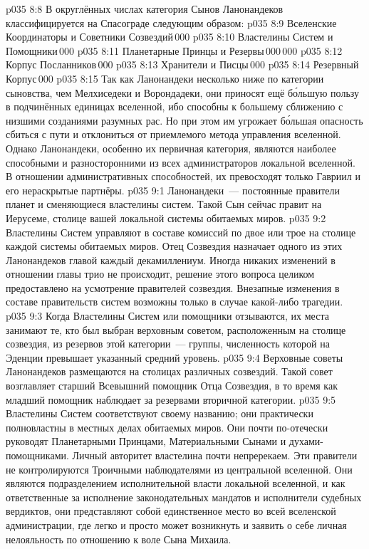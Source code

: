 \vs p035 8:8 В округлённых числах категория Сынов Ланонандеков классифицируется на Спасограде следующим образом:
\vs p035 8:9 \pc Вселенские Координаторы и Советники Созвездий\,000
\vs p035 8:10 Властелины Систем и Помощники\,000
\vs p035 8:11 Планетарные Принцы и Резервы\,000\,000
\vs p035 8:12 Корпус Посланников\,000
\vs p035 8:13 Хранители и Писцы\,000
\vs p035 8:14 Резервный Корпус\,000
\vs p035 8:15 \pc Так как Ланонандеки несколько ниже по категории сыновства, чем Мелхиседеки и Ворондадеки, они приносят ещё б\'ольшую пользу в подчинённых единицах вселенной, ибо способны к большему сближению с низшими созданиями разумных рас. Но при этом им угрожает б\'ольшая опасность сбиться с пути и отклониться от приемлемого метода управления вселенной. Однако Ланонандеки, особенно их первичная категория, являются наиболее способными и разносторонними из всех администраторов локальной вселенной. В отношении административных способностей, их превосходят только Гавриил и его нераскрытые партнёры.
\vs p035 9:1 Ланонандеки~--- постоянные правители планет и сменяющиеся властелины систем. Такой Сын сейчас правит на Иерусеме, столице вашей локальной системы обитаемых миров.
\vs p035 9:2 Властелины Систем управляют в составе комиссий по двое или трое на столице каждой системы обитаемых миров. Отец Созвездия назначает одного из этих Ланонандеков главой каждый декамиллениум. Иногда никаких изменений в отношении главы трио не происходит, решение этого вопроса целиком предоставлено на усмотрение правителей созвездия. Внезапные изменения в составе правительств систем возможны только в случае какой\hyp{}либо трагедии.
\vs p035 9:3 Когда Властелины Систем или помощники отзываются, их места занимают те, кто был выбран верховным советом, расположенным на столице созвездия, из резервов этой категории~--- группы, численность которой на Эденции превышает указанный средний уровень.
\vs p035 9:4 Верховные советы Ланонандеков размещаются на столицах различных созвездий. Такой совет возглавляет старший Всевышний помощник Отца Созвездия, в то время как младший помощник наблюдает за резервами вторичной категории.
\vs p035 9:5 \pc Властелины Систем соответствуют своему названию; они практически полновластны в местных делах обитаемых миров. Они почти по\hyp{}отечески руководят Планетарными Принцами, Материальными Сынами и духами\hyp{}помощниками. Личный авторитет властелина почти непререкаем. Эти правители не контролируются Троичными наблюдателями из центральной вселенной. Они являются подразделением исполнительной власти локальной вселенной, и как ответственные за исполнение законодательных мандатов и исполнители судебных вердиктов, они представляют собой единственное место во всей вселенской администрации, где легко и просто может возникнуть и заявить о себе личная нелояльность по отношению к воле Сына Михаила.
